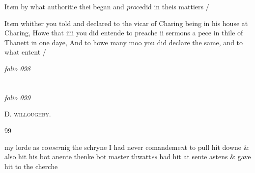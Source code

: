 \documentclass[12pt, a4paper]{book}
\begin{document}
		\ifthenelse{\isodd{\thepage}}
		{\reversemarginpar}
		{\normalmarginpar}
		 It\textit{e}m by what authoritie thei began and \textit{pro}cedid in
	theis mattiers / 

		\ifthenelse{\isodd{\thepage}}
		{\reversemarginpar}
		{\normalmarginpar}
		It\textit{e}m whither you told and declared to the vicar of Charing
 being in his house at Charing, Howe that iiii you did
 entende to preache ii sermons a pece in thile of Thanett
 in one daye, And to howe many moo you did declare the
 same, and to what entent /

\dotfill
					

\textit{folio 098}


         \vspace{4cm}
         
\dotfill
					  \section*{}

\textit{folio 099}




            		
				\begin{center} \begin{large} {\scshape D. willoughby.} \end{large} \end{center}
			
            		\begin{flushright}{\color{Mahogany}99}\end{flushright}
            		
		\ifthenelse{\isodd{\thepage}}
		{\reversemarginpar}
		{\normalmarginpar}
		my lorde as co\textit{nser}nig the schryne I had never comandeme\textit{n}t
 to pull hit downe \& also hit his bot anente thenke
 bot master thwatt\textit{es} had hit at sente astens \& gave
 hit to the cherche
            		
\end{document}
